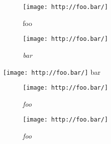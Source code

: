 
\def\mytitle{Figure Images}


\begin{figure}[htbp]
\centering
\texttt{[image: http://foo.bar/]}
\caption[foo]{foo}
\label{foo}
\end{figure}

\begin{figure}[htbp]
\centering
\texttt{[image: http://foo.bar/]}
\caption[foo]{\emph{bar}}
\label{foo}
\end{figure}

\texttt{[image: http://foo.bar/]} bar

\begin{figure}[htbp]
\centering
\texttt{[image: http://foo.bar/]}
\caption[foo]{\emph{foo}}
\end{figure}

\begin{figure}[htbp]
\centering
\texttt{[image: http://foo.bar/]}
\caption[foo]{\emph{foo}}
\end{figure}



